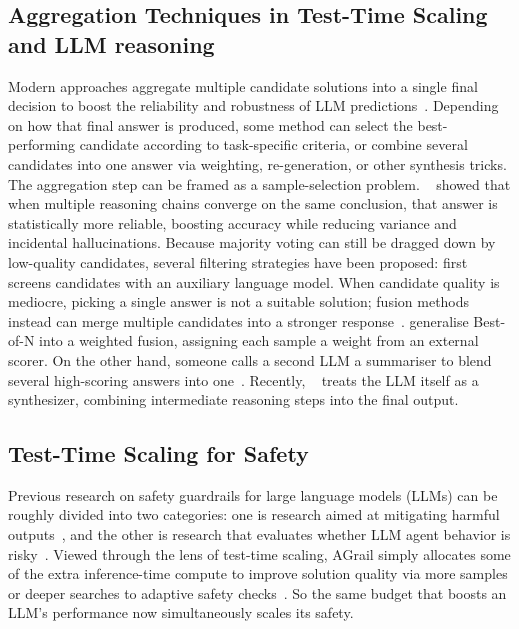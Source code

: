 \documentclass{article} %
\theoremstyle{definition}
\theoremstyle{remark}
\begin{document}
\subsection{Aggregation Techniques in Test-Time Scaling and LLM reasoning}
Modern approaches aggregate multiple candidate solutions into a single final decision to boost the reliability and robustness of LLM predictions~\citep{zhang2025survey}. Depending on how that final answer is produced, some method can select the best-performing candidate according to task-specific criteria, or combine several candidates into one answer via weighting, re-generation, or other synthesis tricks. The aggregation step can be framed as a sample-selection problem. ~\cite{wangself} showed that when multiple reasoning chains converge on the same conclusion, that answer is statistically more reliable, boosting accuracy while reducing variance and incidental hallucinations. Because majority voting can still be dragged down by low-quality candidates, several filtering strategies have been proposed: \cite{chen2024are} first screens candidates with an auxiliary language model. When candidate quality is mediocre, picking a single answer is not a suitable solution; fusion methods instead can merge multiple candidates into a stronger response~\citep{irvine2023rewarding}. \cite{brown2024largelanguagemonkeysscaling, li-etal-2023-making} generalise Best-of-N into a weighted fusion, assigning each sample a weight from an external scorer. On the other hand, someone calls a second LLM a summariser to blend several high-scoring answers into one~\citep{jiang-etal-2023-llm}. Recently, ~\cite{li2025llms} treats the LLM itself as a synthesizer, combining intermediate reasoning steps into the final output.







\subsection{Test-Time Scaling for Safety}

Previous research on safety guardrails for large language models (LLMs) can be roughly divided into two categories: one is research aimed at mitigating harmful outputs~\citep{rebedea-etal-2023-nemo, yuan2024rigorllm}, and the other is research that evaluates whether LLM agent behavior is risky~\citep{naihintesting, liaoeia}. Viewed through the lens of test-time scaling, AGrail simply allocates some of the extra inference-time compute to improve solution quality via more samples or deeper searches to adaptive safety checks~\citep{luo-etal-2025-agrail}. So the same budget that boosts an LLM’s performance now simultaneously scales its safety.
\end{document}
